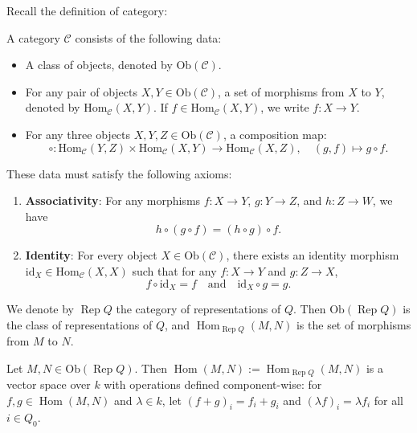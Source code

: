 \documentclass[11pt, a4paper]{report}
\begin{document}
Recall the definition of category:

\begin{definition}
    A category $\mathcal{C}$ consists of the following data:
    \begin{itemize}
        \item A class of objects, denoted by $\mathrm{Ob}(\mathcal{C})$.
        \item For any pair of objects $X, Y \in \mathrm{Ob}(\mathcal{C})$, a set of morphisms from $X$ to $Y$, denoted by $\mathrm{Hom}_{\mathcal{C}}(X, Y)$. If $f \in \mathrm{Hom}_{\mathcal{C}}(X, Y)$, we write $f: X \to Y$.
        \item For any three objects $X, Y, Z \in \mathrm{Ob}(\mathcal{C})$, a composition map:
              \[
                  \circ: \mathrm{Hom}_{\mathcal{C}}(Y, Z) \times \mathrm{Hom}_{\mathcal{C}}(X, Y) \to \mathrm{Hom}_{\mathcal{C}}(X, Z), \quad (g, f) \mapsto g \circ f.
              \]
    \end{itemize}
    These data must satisfy the following axioms:
    \begin{enumerate}
        \item \textbf{Associativity}: For any morphisms $f: X \to Y$, $g: Y \to Z$, and $h: Z \to W$, we have
              \[
                  h \circ (g \circ f) = (h \circ g) \circ f.
              \]
        \item \textbf{Identity}: For every object $X \in \mathrm{Ob}(\mathcal{C})$, there exists an identity morphism $\mathrm{id}_X \in \mathrm{Hom}_{\mathcal{C}}(X, X)$ such that for any $f: X \to Y$ and $g: Z \to X$,
              \[
                  f \circ \mathrm{id}_X = f \quad \text{and} \quad \mathrm{id}_X \circ g = g.
              \]
    \end{enumerate}
\end{definition}

We denote by $\operatorname{Rep}Q$ the category of representations of $Q$. Then $\mathrm{Ob}(\operatorname{Rep}Q)$ is the class of representations of $Q$, and $\operatorname{Hom}_{\operatorname{Rep}Q}(M,N)$ is the set of morphisms from $M$ to $N$.

Let $M,N \in \mathrm{Ob}(\operatorname{Rep}Q)$. Then $\operatorname{Hom}(M,N):= \operatorname{Hom}_{\operatorname{Rep}Q}(M,N)$ is a vector space over $k$ with operations defined component-wise: for $f,g \in \operatorname{Hom}(M,N)$ and $\lambda \in k$, let $(f+g)_i = f_i + g_i$ and $(\lambda f)_i = \lambda f_i$ for all $i \in Q_0$.
\end{document}
